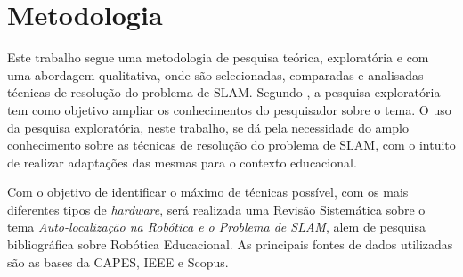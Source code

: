 \chapter[Metodologia]{Metodologia}

Este trabalho segue uma metodologia de pesquisa teórica, exploratória e com uma abordagem qualitativa, onde são selecionadas, comparadas e analisadas técnicas de resolução do problema de SLAM. Segundo \cite{metodologiaCientifica}, a pesquisa exploratória tem como objetivo ampliar os conhecimentos do pesquisador sobre o tema. O uso da pesquisa exploratória, neste trabalho, se dá pela necessidade do amplo conhecimento sobre as técnicas de resolução do problema de SLAM, com o intuito de realizar adaptações das mesmas para o contexto educacional.

Com o objetivo de identificar o máximo de técnicas possível, com os mais diferentes tipos de \textit{hardware}, será realizada uma Revisão Sistemática sobre o tema \textit{Auto-localização na Robótica e o Problema de SLAM}, alem de pesquisa bibliográfica sobre Robótica Educacional. As principais fontes de dados utilizadas são as bases da CAPES, IEEE e Scopus.